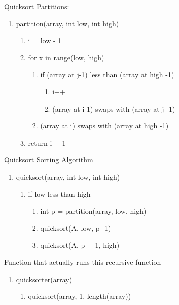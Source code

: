 \documentclass[11pt]{article}
\begin{document}
Quicksort
Partitions:
\begin{enumerate}
\item partition(array, int low, int high)
	\begin{enumerate}
	\item i = low - 1
	\item for x in range(low, high)
		\begin{enumerate}
		\item if (array at j-1) less than (array at high -1)
			\begin{enumerate}
			\item i++
			\item (array at i-1) swaps with (array at j -1)
			\end{enumerate}
		\item (array at i) swaps with (array at high -1)
		\end{enumerate}
	\item return i + 1
	\end{enumerate}
\end{enumerate}

Quicksort Sorting Algorithm
\begin{enumerate}
\item quicksort(array, int low, int high)
	\begin{enumerate}
	\item if low less than high
		\begin{enumerate}
		\item int p = partition(array, low, high)
		\item quicksort(A, low, p -1)
		\item quicksort(A, p + 1, high)
		\end{enumerate}
	\end{enumerate}
\end{enumerate}
Function that actually runs this recursive function
\begin{enumerate}
\item quicksorter(array)
	\begin{enumerate}
	\item quicksort(array, 1, length(array))
	\end{enumerate}
\end{enumerate}
\end{document}

